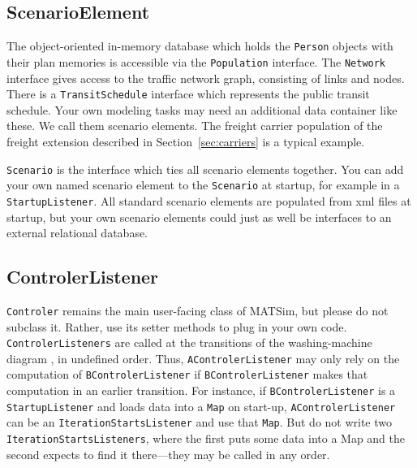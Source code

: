 \subsection{ScenarioElement}
The object-oriented in-memory database which holds the \lstinline|Person| objects with their plan memories is accessible via the
\lstinline|Population| interface. The \lstinline|Network| interface gives access to the traffic network graph, consisting of links and nodes.
There is a \lstinline|TransitSchedule| interface which represents the public transit schedule. Your own modeling tasks may need an additional data container
like these. We call them scenario elements. The freight carrier population of the freight extension described in Section~\ref{sec:carriers} is a typical example. 

\lstinline|Scenario| is the interface which ties all scenario elements together. You can add your own named scenario element
to the \lstinline|Scenario| at startup, for example in a \lstinline|StartupListener|. All standard scenario elements are populated
from \gls{xml} files at startup, but your own scenario elements could just as well be interfaces to an external relational database.

\subsection{ControlerListener}
\label{sec:controlerListener-extension-point}
\label{sec:controlerextension}
\lstinline|Controler| remains the main user-facing class of MATSim, but please do not subclass it. Rather, use its setter methods to plug in your own code.
\lstinline|ControlerListeners| are called at the transitions of the washing-machine diagram , in undefined order.
Thus, \lstinline|AControlerListener| may only rely on the computation of \lstinline|BControlerListener| if \lstinline|BControlerListener|
 makes that computation in an earlier transition. For instance, if \lstinline|BControlerListener| is a \lstinline|StartupListener|
 and loads data into a \lstinline|Map| on start-up, \lstinline|AControlerListener| can be an \lstinline|IterationStartsListener| and use that \lstinline|Map|.
 But do not write two \lstinline|IterationStartsListeners|, where the first puts some data into a Map and the second expects to find it there---they may be called in any order.

